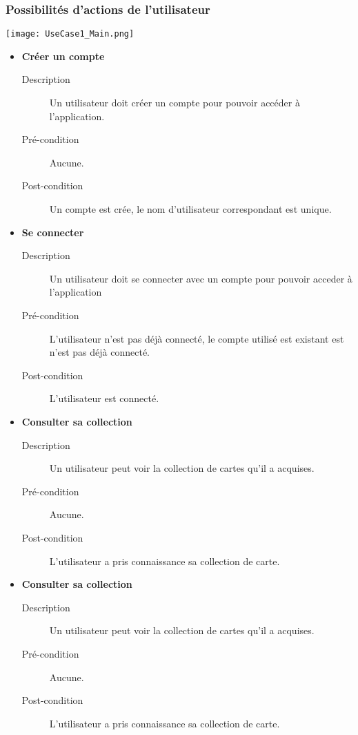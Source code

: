 \documentclass{article}
\begin{document}
		\subsubsection{Possibilités d'actions de l'utilisateur}
			\begin{center}\texttt{[image: UseCase1\_Main.png]}\end{center}
			\begin{itemize}
				\item \textbf{Créer un compte}
				\begin{description}
					\item[Description] Un utilisateur doit créer un compte pour pouvoir accéder à l'application.
					\item[Pré-condition] Aucune.
					\item[Post-condition] Un compte est crée, le nom d'utilisateur correspondant est unique.\\
				\end{description}

				\item \textbf{Se connecter}
				\begin{description}
					\item[Description] Un utilisateur doit se connecter avec un compte pour pouvoir acceder à l'application
					\item[Pré-condition] L'utilisateur n'est pas déjà connecté, le compte utilisé est existant est n'est pas déjà connecté.
					\item[Post-condition] L'utilisateur est connecté.\\
				\end{description}

				\item \textbf{Consulter sa collection}
				\begin{description}
					\item[Description] Un utilisateur peut voir la collection de cartes qu'il a acquises.
					\item[Pré-condition] Aucune.
					\item[Post-condition] L'utilisateur a pris connaissance sa collection de carte.\\
				\end{description}

				\item \textbf{Consulter sa collection}
				\begin{description}
					\item[Description] Un utilisateur peut voir la collection de cartes qu'il a acquises.
					\item[Pré-condition] Aucune.
					\item[Post-condition] L'utilisateur a pris connaissance sa collection de carte.\\
				\end{description}


\end{itemize}
\end{document}
